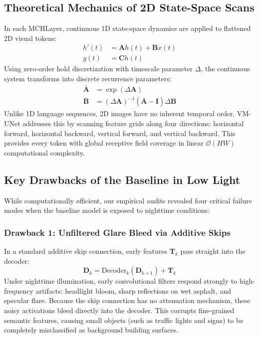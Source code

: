 \documentclass[conference]{IEEEtran}
\begin{document}
\subsection{Theoretical Mechanics of 2D State-Space Scans}
In each MCHLayer, continuous 1D state-space dynamics are applied to flattened 2D visual tokens:
\begin{align}
h'(t) &= \mathbf{A} h(t) + \mathbf{B} x(t) \\
y(t) &= \mathbf{C} h(t)
\end{align}
Using zero-order hold discretization with timescale parameter $\Delta$, the continuous system transforms into discrete recurrence parameters:
\begin{align}
\mathbf{\bar{A}} &= \exp(\Delta \mathbf{A}) \\
\mathbf{\bar{B}} &= (\Delta \mathbf{A})^{-1} (\mathbf{\bar{A}} - \mathbf{I}) \Delta \mathbf{B}
\end{align}
Unlike 1D language sequences, 2D images have no inherent temporal order. VM-UNet addresses this by scanning feature grids along four directions: horizontal forward, horizontal backward, vertical forward, and vertical backward. This provides every token with global receptive field coverage in linear $\mathcal{O}(HW)$ computational complexity.

\subsection{Key Drawbacks of the Baseline in Low Light}
While computationally efficient, our empirical audits revealed four critical failure modes when the baseline model is exposed to nighttime conditions:

\subsubsection{Drawback 1: Unfiltered Glare Bleed via Additive Skips}
In a standard additive skip connection, early features $\mathbf{T}_k$ pass straight into the decoder:
\begin{equation}
\mathbf{D}_k = \text{Decoder}_k(\mathbf{D}_{k+1}) + \mathbf{T}_k
\end{equation}
Under nighttime illumination, early convolutional filters respond strongly to high-frequency artifacts: headlight bloom, sharp reflections on wet asphalt, and specular flare. Because the skip connection has no attenuation mechanism, these noisy activations bleed directly into the decoder. This corrupts fine-grained semantic features, causing small objects (such as traffic lights and signs) to be completely misclassified as background building surfaces.
\end{document}

